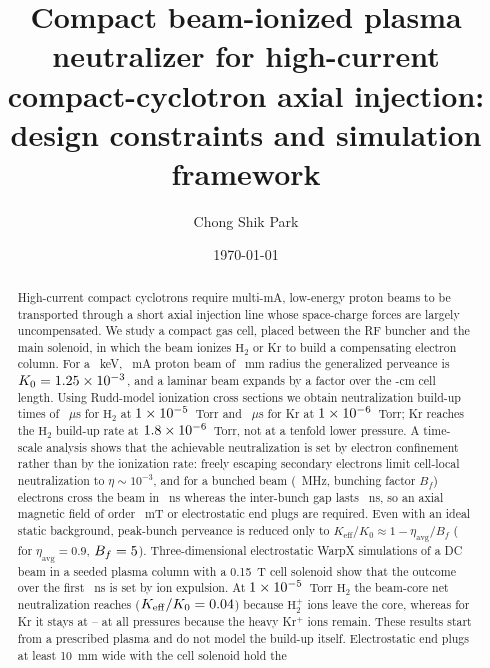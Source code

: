 \documentclass[aps,prab,10pt,twocolumn,superscriptaddress,showpacs,floatfix]{revtex4-2}
\newcommand{\Keff}{K_{\mathrm{eff}}}
\newcommand{\etaavg}{\eta_{\mathrm{avg}}}
\newcommand{\Htwo}{\mathrm{H}_2}
\begin{document}
\title{Compact beam-ionized plasma neutralizer for high-current compact-cyclotron
axial injection: design constraints and simulation framework}

\author{Chong Shik Park}

\date{\today}

\begin{abstract}
High-current compact cyclotrons require multi-mA, low-energy proton beams to be
transported through a short axial injection line whose space-charge forces are
largely uncompensated. We study a compact gas cell, placed between the RF buncher and
the main solenoid, in which the beam ionizes $\Htwo$ or Kr to build a compensating
electron column. For a \numEkev~keV, \numIavgma~mA proton beam of \numabeammm~mm radius
the generalized perveance is $K_0=1.25\times10^{-3}$, and a laminar beam expands by a factor
\numgrowthKzero{} over the \numLcellcm-cm cell length. Using Rudd-model ionization
cross sections we obtain neutralization build-up times of \numtauHtwous~$\mu$s for
$\Htwo$ at $1\times10^{-5}$~Torr and \numtauKrus~$\mu$s for Kr at $1\times10^{-6}$~Torr; Kr reaches
the $\Htwo$ build-up rate at $1.8\times10^{-6}$~Torr, not at a tenfold lower pressure.
A time-scale analysis shows that the achievable neutralization is set by electron
confinement rather than by the ionization rate: freely escaping secondary electrons
limit cell-local neutralization to $\eta\sim10^{-3}$, and for a bunched beam
(\numfRFmhz~MHz, bunching factor $B_f$) electrons cross the beam in
\numtcrossns~ns whereas the inter-bunch gap lasts \numgapns~ns, so an axial magnetic
field of order \numBconfine~mT or electrostatic end plugs are required. Even with an
ideal static background, peak-bunch perveance is reduced only to
$\Keff/K_0\approx1-\etaavg/B_f$ (\numKeffpeakstatic{} for $\etaavg=0.9$, $B_f=5$).
Three-dimensional electrostatic WarpX simulations of a DC beam in a seeded plasma column
with a 0.15~T cell solenoid show that the outcome over the first \numpicns~ns is set by
ion expulsion. At $1\times10^{-5}$~Torr $\Htwo$ the beam-core net neutralization reaches
\numpicHtwoeta{} ($\Keff/K_0=\numpicHtwokeff$) because $\Htwo^+$ ions leave the core, whereas
for Kr it stays at \numpicKretamin--\numpicKretamax{} at all pressures because the heavy
Kr$^+$ ions remain. These results start from a prescribed plasma and do not model the
build-up itself. Electrostatic end plugs at least 10~mm wide with the cell solenoid hold the

\end{abstract}
\end{document}
